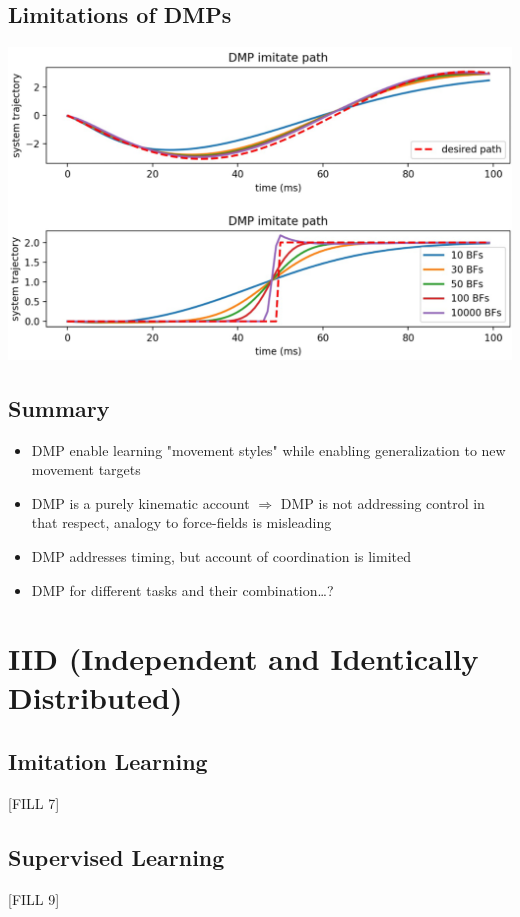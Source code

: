 \documentclass[10pt]{article}
\begin{document}
\subsection*{Limitations of DMPs}
\begin{center} 
	\includegraphics*[width=\textwidth]{L1_14.png} 
\end{center}

\subsection*{Summary}
\begin{itemize}
	\item DMP enable learning "movement styles" while enabling generalization to new movement targets
	\item DMP is a purely kinematic account $\Rightarrow$ DMP is not addressing control in that respect, analogy to force-fields is misleading
	\item DMP addresses timing, but account of coordination is limited
	\item DMP for different tasks and their combination\dots?
\end{itemize}

\section*{IID (Independent and Identically Distributed)}
\subsection*{Imitation Learning}
[FILL 7]
\subsection*{Supervised Learning}
[FILL 9]
\end{document}
